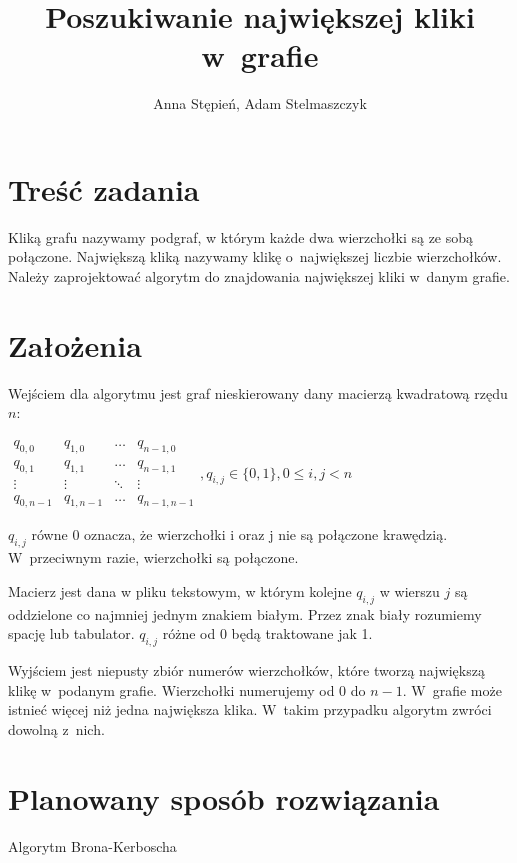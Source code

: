 \documentclass[12pt, a4paper]{article}
\title{\textbf{Poszukiwanie największej kliki w~grafie}}
\author{Anna Stępień, Adam Stelmaszczyk}
\date{}
\begin{document}
\maketitle
\section{Treść zadania}

Kliką grafu nazywamy podgraf, w którym każde dwa wierzchołki są ze sobą połączone.
Największą kliką nazywamy klikę o~największej liczbie wierzchołków.
Należy zaprojektować algorytm do znajdowania największej kliki w~danym grafie.

\section{Założenia}

Wejściem dla algorytmu jest graf nieskierowany dany macierzą kwadratową rzędu $n$:

\bigskip
$ 
\begin{array}{cccc}
q_{0,0} & q_{1,0} & \ldots & q_{n-1,0} \\
q_{0,1} & q_{1,1} & \ldots & q_{n-1,1} \\
\vdots  & \vdots  & \ddots & \vdots  \\
q_{0,n-1} & q_{1,n-1} & \ldots & q_{n-1,n-1} 
\end{array}
, q_{i,j} \in \{0,1\}, 0 \leq i,j < n
$
\bigskip

$q_{i,j}$ równe 0 oznacza, że wierzchołki i oraz j nie są połączone krawędzią. W~przeciwnym razie, wierzchołki są połączone.
\par\vspace{\baselineskip}
Macierz jest dana w pliku tekstowym, w którym kolejne $q_{i,j}$ w wierszu $j$ są oddzielone co najmniej jednym znakiem białym. 
Przez znak biały rozumiemy spację lub tabulator. $q_{i,j}$ różne od 0 będą traktowane jak 1.
\par\vspace{\baselineskip}
Wyjściem jest niepusty zbiór numerów wierzchołków, które tworzą największą klikę w~podanym grafie. 
Wierzchołki numerujemy od 0 do $n-1$. W~grafie może istnieć więcej niż jedna największa klika.
W~takim przypadku algorytm zwróci dowolną z~nich.

\section{Planowany sposób rozwiązania}
Algorytm Brona-Kerboscha\cite{bk}


\end{document}

